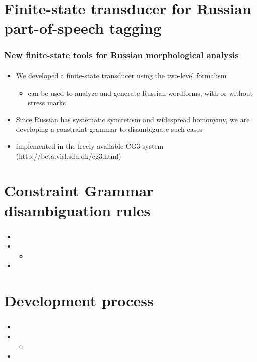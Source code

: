 \documentclass{beamer}
\begin{document}
\section{Finite-state transducer for Russian part-of-speech tagging} %
\begin{frame}
\frametitle{New finite-state tools for Russian morphological analysis}
\framesubtitle{}
\begin{itemize}
	\item We developed a finite-state transducer using the two-level formalism \cite{Koskenniemi-83}
	\pause
	\begin{itemize}
		\item can be used to analyze and generate Russian wordforms, with or without stress marks
		\pause
	\end{itemize}
	\item Since Russian has systematic syncretism and widespread homonymy, we are developing a constraint grammar \cite{Karlsson.Voutilainen.ea-95} to disambiguate such cases
	\pause
	\item implemented in the freely available CG3 system (http://beta.visl.sdu.dk/cg3.html)
\end{itemize}
\end{frame}

\section{Constraint Grammar disambiguation rules} %

\begin{frame}
\frametitle{}
\framesubtitle{}
\begin{itemize}
	\item 
	\pause
	\item 
	\begin{itemize}
		\item 
		\pause
	\end{itemize}
	\item 
\end{itemize}
\end{frame}


\section{Development process} %
\begin{frame}
\frametitle{}
\framesubtitle{}
\begin{itemize}
	\item 
	\pause
	\item 
	\begin{itemize}
		\item 
		\pause
	\end{itemize}
	\item 
\end{itemize}
\end{frame}
\end{document}
